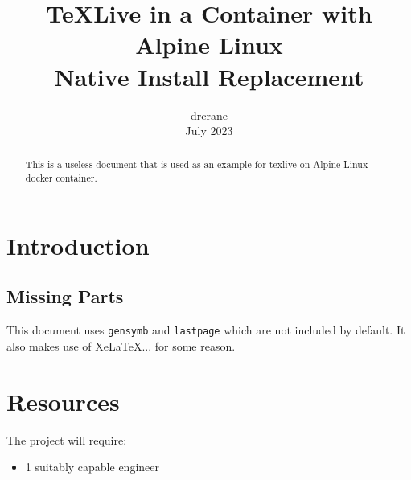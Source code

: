 \documentclass[11pt]{article}
\title{{\huge TeXLive in a Container with Alpine Linux}\\{\small Native Install Replacement}}
\author{drcrane \\
July 2023}
\date{}
\begin{document}
\maketitle

\begin{abstract}
This is a useless document that is used as an example for texlive on Alpine Linux docker
container.
\end{abstract}

\thispagestyle{firststyle}

\section{Introduction}

\subsection{Missing Parts}

This document uses {\tt gensymb} and {\tt lastpage} which are not included by default.
It also makes use of XeLaTeX... for some reason.

\section{Resources}

The project will require:

\begin{itemize}
\item 1 suitably capable engineer
\end{itemize}
\end{document}
